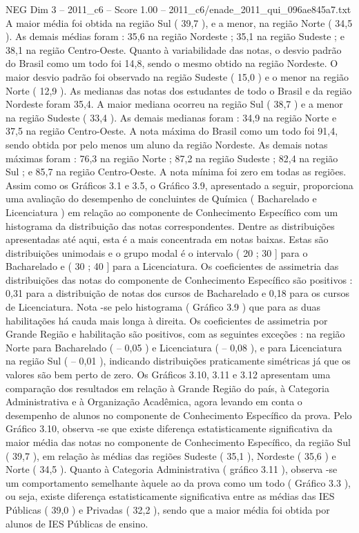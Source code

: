 \begin{textsample}{NEG Dim 3 – 2011\_c6 – Score 1.00 – 2011\_c6/enade\_2011\_qui\_096ae845a7.txt}
A maior média foi obtida na região Sul ( 39,7 ), e a menor, na região Norte ( 34,5 ).
As demais médias foram : 35,6 na região Nordeste ; 35,1 na região Sudeste ; e 38,1 na região Centro-Oeste.
Quanto à variabilidade das notas, o desvio padrão do Brasil como um todo foi 14,8, sendo o mesmo obtido na região Nordeste.
O maior desvio padrão foi observado na região Sudeste ( 15,0 ) e o menor na região Norte ( 12,9 ).
As medianas das notas dos estudantes de todo o Brasil e da região Nordeste foram 35,4.
A maior mediana ocorreu na região Sul ( 38,7 ) e a menor na região Sudeste ( 33,4 ).
As demais medianas foram : 34,9 na região Norte e 37,5 na região Centro-Oeste.
A nota máxima do Brasil como um todo foi 91,4, sendo obtida por pelo menos um aluno da região Nordeste.
As demais notas máximas foram : 76,3 na região Norte ; 87,2 na região Sudeste ; 82,4 na região Sul ; e 85,7 na região Centro-Oeste.
A nota mínima foi zero em todas as regiões.
Assim como os Gráficos 3.1 e 3.5, o Gráfico 3.9, apresentado a seguir, proporciona uma avaliação do desempenho de concluintes de Química ( Bacharelado e Licenciatura ) em relação ao componente de Conhecimento Específico com um histograma da distribuição das notas correspondentes.
Dentre as distribuições apresentadas até aqui, esta é a mais concentrada em notas baixas.
Estas são distribuições unimodais e o grupo modal é o intervalo ( 20 ; 30 ] para o Bacharelado e ( 30 ; 40 ] para a Licenciatura.
Os coeficientes de assimetria das distribuições das notas do componente de Conhecimento Específico são positivos : 0,31 para a distribuição de notas dos cursos de Bacharelado e 0,18 para os cursos de Licenciatura.
Nota -se pelo histograma ( Gráfico 3.9 ) que para as duas habilitações há cauda mais longa à direita.
Os coeficientes de assimetria por Grande Região e habilitação são positivos, com as seguintes exceções : na região Norte para Bacharelado ( – 0,05 ) e Licenciatura ( – 0,08 ), e para Licenciatura na região Sul ( – 0,01 ), indicando distribuições praticamente simétricas já que os valores são bem perto de zero.
Os Gráficos 3.10, 3.11 e 3.12 apresentam uma comparação dos resultados em relação à Grande Região do país, à Categoria Administrativa e à Organização Acadêmica, agora levando em conta o desempenho de alunos no componente de Conhecimento Específico da prova.
Pelo Gráfico 3.10, observa -se que existe diferença estatisticamente significativa da maior média das notas no componente de Conhecimento Específico, da região Sul ( 39,7 ), em relação às médias das regiões Sudeste ( 35,1 ), Nordeste ( 35,6 ) e Norte ( 34,5 ).
Quanto à Categoria Administrativa ( gráfico 3.11 ), observa -se um comportamento semelhante àquele ao da prova como um todo ( Gráfico 3.3 ), ou seja, existe diferença estatisticamente significativa entre as médias das IES Públicas ( 39,0 ) e Privadas ( 32,2 ), sendo que a maior média foi obtida por alunos de IES Públicas de ensino.

\end{textsample}

